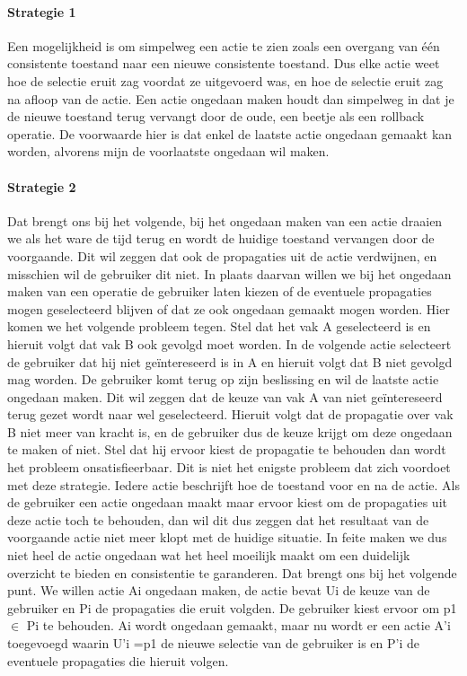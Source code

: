 \paragraph{Strategie 1}
Een mogelijkheid is om simpelweg een actie te zien zoals een overgang van \'{e}\'{e}n consistente toestand naar een nieuwe consistente toestand. Dus elke actie weet hoe de selectie eruit zag voordat ze uitgevoerd was, en hoe de selectie eruit zag na afloop van de actie. Een actie ongedaan maken houdt dan simpelweg in dat je de nieuwe toestand terug vervangt door de oude, een beetje als een rollback operatie. De voorwaarde hier is dat enkel de laatste actie ongedaan gemaakt kan worden, alvorens mijn de voorlaatste ongedaan wil maken. 

\paragraph{Strategie 2}
Dat brengt ons bij het volgende, bij het ongedaan maken van een actie draaien we als het ware de tijd terug en wordt de huidige toestand vervangen door de voorgaande. Dit wil zeggen dat ook de propagaties uit de actie verdwijnen, en misschien wil de gebruiker dit niet. In plaats daarvan willen we bij het ongedaan maken van een operatie de gebruiker laten kiezen of de eventuele propagaties mogen geselecteerd blijven of dat ze ook ongedaan gemaakt mogen worden. Hier komen we het volgende probleem tegen. Stel dat het vak A geselecteerd is en hieruit volgt dat vak B ook gevolgd moet worden. In de volgende actie selecteert de gebruiker dat hij niet ge\"{i}ntereseerd is in A en hieruit volgt dat B niet gevolgd mag worden. De gebruiker komt terug op zijn beslissing en wil de laatste actie ongedaan maken. Dit wil zeggen dat de keuze van vak A van niet ge\"{i}ntereseerd terug gezet wordt naar wel geselecteerd. Hieruit volgt dat de propagatie over vak B niet meer van kracht is, en de gebruiker dus de keuze krijgt om deze ongedaan te maken of niet. Stel dat hij ervoor kiest de propagatie te behouden dan wordt het probleem onsatisfieerbaar. Dit is niet het enigste probleem dat zich voordoet met deze strategie. Iedere actie beschrijft hoe de toestand voor en na de actie. Als de gebruiker een actie ongedaan maakt maar ervoor kiest om de propagaties uit deze actie toch te behouden, dan wil dit dus zeggen dat het resultaat van de voorgaande actie niet meer klopt met de huidige situatie. In feite maken we dus niet heel de actie ongedaan wat het heel moeilijk maakt om een duidelijk overzicht te bieden en consistentie te garanderen. Dat brengt ons bij het volgende punt. We willen actie Ai ongedaan maken, de actie bevat Ui de keuze van de gebruiker en Pi de propagaties die eruit volgden. De gebruiker kiest ervoor om p1 $\in$ Pi te behouden. Ai wordt ongedaan gemaakt, maar nu wordt er een actie A'i toegevoegd waarin U'i ={p1} de nieuwe selectie van de gebruiker is en P'i de eventuele propagaties die hieruit volgen. 

